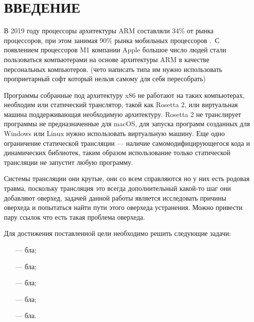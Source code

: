 \section*{ВВЕДЕНИЕ}

В 2019 году процессоры архитектуры ARM составляли 34\% от рынка процессоров, при этом занимая 90\% рынка мобильных процессоров \cite{arm_report}. С появлением процессоров M1 компании Apple большое число людей стали пользоваться компьютерами на основе архитектуры ARM в качестве персональных компьютеров. (чето написать типа им нужно использовать проприетарный софт который нельзя самому для себя пересобрать)

Программы собранные под архитектуру x86 не работают на таких компьютерах, необходим или статический транслятор, такой как Rosetta 2, или виртуальная машина поддерживающая необходимую архитектуру. Rosetta 2 не транслирует программы не предназначенные для macOS, для запуска программ созданных для Windows или Linux нужно использовать виртуальную машину. Еще одно ограничение статической трансляции --- наличие самомодифицирующегося кода и динамических библиотек, таким образом использование только статической трансляции не запустит любую программу. \cite{fast_bin}

Системы трансляции они крутые, они со всем справляются но у них есть родовая травма, поскольку трансляция это всегда дополнительный какой-то шаг они добавляют оверхед, задачей данной работы является исследовать причины оверхеда и попытаться найти пути этого оверхеда устранения. Можно привести пару ссылок что есть такая проблема оверхеда.

Для достижения поставленной цели необходимо решить следующие задачи:

\begin{itemize}[leftmargin=1.6\parindent]
	\item[---] бла;
	\item[---] бла;
	\item[---] бла;
	\item[---] бла;
	\item[---] бла.
\end{itemize}

\pagebreak